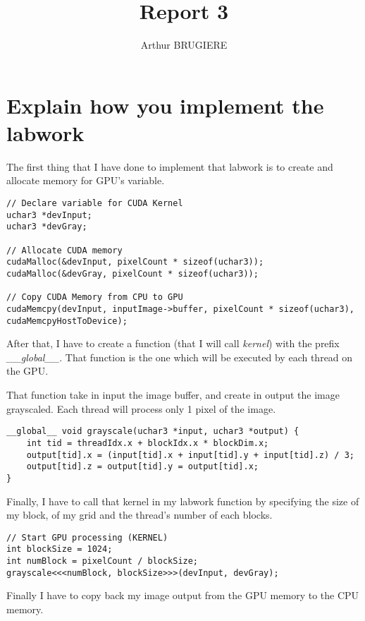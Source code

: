 \documentclass[11pt]{article} %
\title{Report 3}
\author{Arthur BRUGIERE}
\begin{document}
\maketitle

\section{Explain how you implement the labwork}

The first thing that I have done to implement that labwork is to create and allocate memory for GPU's variable.

\begin{lstlisting}[style=CStyle]
// Declare variable for CUDA Kernel
uchar3 *devInput;
uchar3 *devGray;

// Allocate CUDA memory
cudaMalloc(&devInput, pixelCount * sizeof(uchar3));
cudaMalloc(&devGray, pixelCount * sizeof(uchar3));

// Copy CUDA Memory from CPU to GPU
cudaMemcpy(devInput, inputImage->buffer, pixelCount * sizeof(uchar3), cudaMemcpyHostToDevice);
\end{lstlisting}

After that, I have to create a function (that I will call {\it kernel}) with the prefix {\it \_\_global\_\_}. That function is the one which will be executed by each thread on the GPU.

That function take in input the image buffer, and create in output the image grayscaled. Each thread will process only 1 pixel of the image.

\begin{lstlisting}[style=CStyle]
__global__ void grayscale(uchar3 *input, uchar3 *output) {
    int tid = threadIdx.x + blockIdx.x * blockDim.x;
    output[tid].x = (input[tid].x + input[tid].y + input[tid].z) / 3;
    output[tid].z = output[tid].y = output[tid].x;
}
\end{lstlisting}

Finally, I have to call that kernel in my labwork function by specifying the size of my block, of my grid and the thread's number of each blocks.

\begin{lstlisting}[style=CStyle]
// Start GPU processing (KERNEL)
int blockSize = 1024;
int numBlock = pixelCount / blockSize;
grayscale<<<numBlock, blockSize>>>(devInput, devGray);
\end{lstlisting}

Finally I have to copy back my image output from the GPU memory to the CPU memory.
\end{document}
